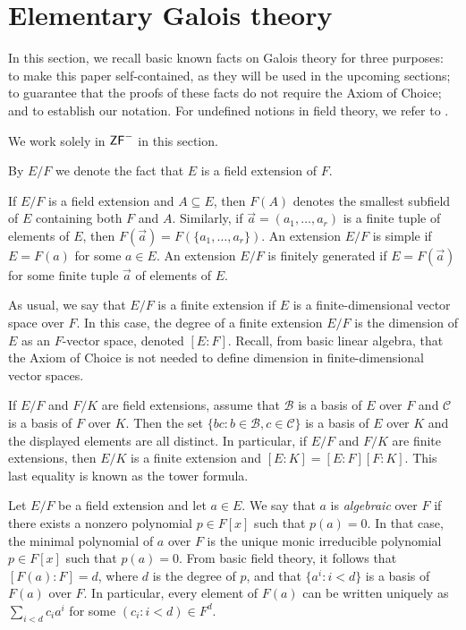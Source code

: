 \section{Elementary Galois theory}\label{sec:galois}

In this section, we recall basic known facts on Galois theory for three purposes: to make this paper self-contained, as they will be used in the upcoming sections; to guarantee that the proofs of these facts do not require the Axiom of Choice; and to establish our notation.
For undefined notions in field theory, we refer to \cite{Rotman1998}.

We work solely in $\mathsf{ZF}^{-}$ in this section.
\vspace{1em}

By $E/F$ we denote the fact that $E$ is a field extension of $F$.

If $E/F$ is a field extension and $A\subseteq E$, then $F(A)$ denotes the smallest subfield of $E$ containing both $F$ and $A$.
Similarly, if $\vec a=(a_1,\ldots,a_r)$ is a finite tuple of elements of $E$, then $F(\vec a)=F(\{a_1,\ldots,a_r\})$.
An extension $E/F$ is simple if $E=F(a)$ for some $a\in E$.
An extension $E/F$ is finitely generated if $E=F(\vec a)$ for some finite tuple $\vec a$ of elements of $E$.

As usual, we say that $E/F$ is a finite extension if $E$ is a finite-dimensional vector space over $F$.
In this case, the degree of a finite extension $E/F$ is the dimension of $E$ as an $F$-vector space, denoted $[E:F]$.
Recall, from basic linear algebra, that the Axiom of Choice is not needed to define dimension in finite-dimensional vector spaces.

If $E/F$ and $F/K$ are field extensions, assume that $\mathcal B$ is a basis of $E$ over $F$ and $\mathcal C$ is a basis of $F$ over $K$. Then the set $\{bc:b\in\mathcal B, c\in\mathcal C\}$ is a basis of $E$ over $K$ and the displayed elements are all distinct.
In particular, if $E/F$ and $F/K$ are finite extensions, then $E/K$ is a finite extension and $[E:K]=[E:F][F:K]$.
This last equality is known as the tower formula.

Let $E/F$ be a field extension and let $a \in E$.
We say that $a$ is \emph{algebraic} over $F$ if there exists a nonzero polynomial $p \in F[x]$ such that $p(a) = 0$.
In that case, the minimal polynomial of $a$ over $F$ is the unique monic irreducible polynomial $p \in F[x]$ such that $p(a) = 0$.
From basic field theory, it follows that $[F(a):F]=d$, where $d$ is the degree of $p$, and that $\{a^i:i<d\}$ is a basis of $F(a)$ over $F$.
In particular, every element of $F(a)$ can be written uniquely as $\sum_{i<d}c_i a^i$ for some $(c_i:i<d)\in F^d$.

